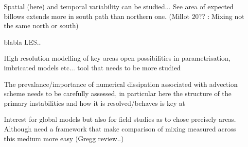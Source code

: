 Spatial (here) and temporal variability can be studied... See area of expected billows extends more in south path than northern one. (Millot 20?? : Mixing not the same north or south)



blabla LES..

High resolution modelling of key areas open possibilities in parametrisation, imbricated models etc... tool that needs to be more studied 

The prevalance/importance of numerical dissipation associated with advection scheme needs to be carefully assessed, in particular here the structure of the primary instabilities and how it is resolved/behaves is key at 

Interest for global models but also for field studies as to chose precisely areas. Although need a framework that make comparison of mixing measured across this medium more easy (Gregg review..)








